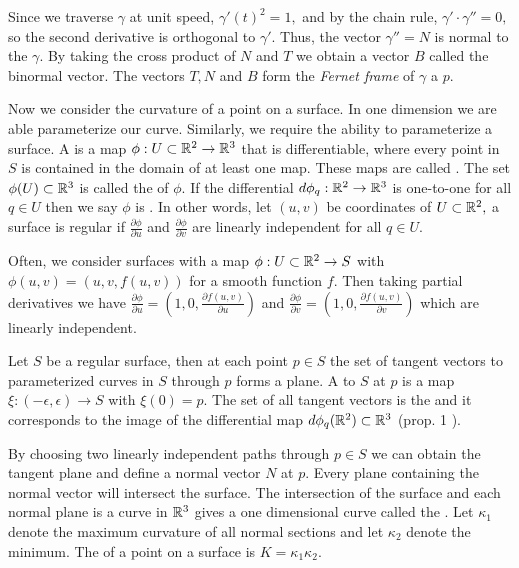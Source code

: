Since we traverse $\gamma$
at unit speed, $\gamma'(t)^2=1,$ and by the chain rule, $\gamma'\cdot \gamma''=0,$
so  the second derivative is orthogonal to $\gamma'$. Thus, the
vector $\gamma''=N$ is normal to the $\gamma$. 
By taking the cross product of $N$ and $T$ we obtain a vector $B$ called
the binormal vector.
The vectors $T,N$ and $B$ form the \emph{Fernet frame} of $\gamma$ a $p.$

Now we consider the curvature of a point on a surface. In one dimension we are
able parameterize our curve. Similarly, we require the ability to parameterize a surface.
A  is a map $\phi:U\subset \mathbb{R}^2 \to \mathbb{R}^3$ that
is differentiable, where every point in $S$ is contained in the domain of at least one map.
These maps are called .
 The set $\phi(U)\subset \mathbb{R}^3$ is called the  of $\phi$.
If the differential $d\phi_q:\mathbb{R}^2\to \mathbb{R}^3$ is one-to-one for all $q\in U$ then
we say $\phi$ is . In other words, let $(u,v)$ be coordinates of $U\subset \mathbb{R}^2,$
a surface is regular if $\frac{\partial\phi}{\partial u}$
and $\frac{\partial\phi}{\partial v}$ are linearly independent for all $q\in U$.

Often, we consider surfaces with a map $\phi:U\subset \mathbb{R}^2\to S$ with $\phi(u,v)=(u,v,f(u,v))$ for
a smooth function $f$. Then taking partial derivatives we have
$\frac{\partial\phi}{\partial u}=\left(1,0,\frac{\partial f(u,v)}{\partial u}\right)$ and 
$\frac{\partial\phi}{\partial v}=\left(1,0,\frac{\partial f(u,v)}{\partial v}\right)$
which are linearly independent.


Let $S$ be a regular surface, then at each point $p\in S$ the set of tangent vectors
to parameterized curves in $S$ through $p$ forms a plane.
A  to $S$ at $p$ is a map $\xi:(-\epsilon,\epsilon)\to S$ with $\xi(0)=p$.
The set of all tangent vectors is the  and it corresponds to the image
of the differential map $d\phi_q(\mathbb{R}^2)\subset \mathbb{R}^3$ (prop. 1 \cite{doc76}).


By choosing two linearly independent paths through $p\in S$ we can obtain the tangent
plane and define a normal vector $N$ at $p$.
Every plane containing the normal vector will intersect the surface.
The intersection of the surface and each normal plane is a curve in $\mathbb{R}^3$
gives a one dimensional curve called the . 
Let $\kappa_1$ denote the maximum curvature of all normal sections 
and let $\kappa_2$ denote the minimum. 
The  of a point on a surface is
$K=\kappa_1\kappa_2.$



